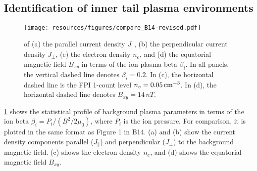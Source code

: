 \documentclass[draft]{agujournal2019}
\begin{document}
\subsection{Identification of inner tail plasma
environments}\label{sec:tail_environments}

\begin{figure}
\centering
\noindent\texttt{[image: resources/figures/compare\_B14-revised.pdf]}
\caption{
     of (a) the parallel current density $J_\|$, (b) the perpendicular current density $J_\perp$, (c) the electron density $n_e$, and (d) the equatorial magnetic field $B_{xy}$ in terms of the ion plasma beta $\beta_i$.  In all panels, the vertical dashed line denotes ${\beta_i=0.2}$. In (c), the horizontal dashed line is the FPI 1-count level ${n_e=0.05\,\si{cm\tothe{-3}}}$. In (d), the horizontal dashed line denotes ${B_{xy}=14\,\si{nT}}$. 
}
\label{fig:compare_B14}
\end{figure}

\cref{fig:compare_B14} shows the statistical profile of background plasma parameters in terms of the ion beta ${\beta_i=P_i/(B^2/2\mu_0)}$, where $P_i$ is the ion pressure. For comparison, it is plotted in the same format as Figure 1 in B14. (a) and (b) show the current density components parallel ($J_\|$) and perpendicular ($J_\perp$) to the background magnetic field. (c) shows the electron density $n_e$, and (d) shows the equatorial magnetic field $B_{xy}$.  
\end{document}
